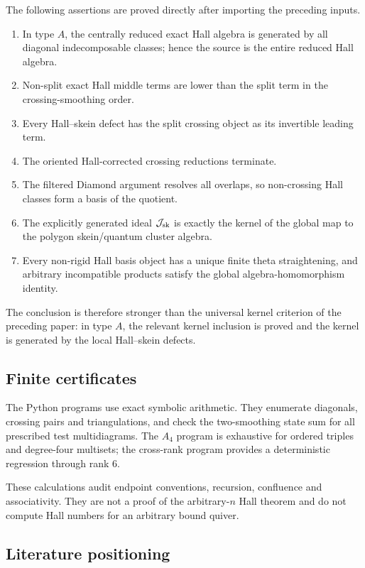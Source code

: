 The following assertions are proved directly after importing the preceding
inputs.
\begin{enumerate}[label=(\Alph*),leftmargin=2.5em]
\item In type $A$, the centrally reduced exact Hall algebra is generated by
      all diagonal indecomposable classes; hence the source is the entire
      reduced Hall algebra.
\item Non-split exact Hall middle terms are lower than the split term in the
      crossing-smoothing order.
\item Every Hall--skein defect has the split crossing object as its invertible
      leading term.
\item The oriented Hall-corrected crossing reductions terminate.
\item The filtered Diamond argument resolves all overlaps, so non-crossing
      Hall classes form a basis of the quotient.
\item The explicitly generated ideal $\mathcal J_{\mathrm{sk}}$ is exactly the kernel of the
      global map to the polygon skein/quantum cluster algebra.
\item Every non-rigid Hall basis object has a unique finite theta
      straightening, and arbitrary incompatible products satisfy the global
      algebra-homomorphism identity.
\end{enumerate}

The conclusion is therefore stronger than the universal kernel criterion of
the preceding paper: in type $A$, the relevant kernel inclusion is proved and
the kernel is generated by the local Hall--skein defects.

\subsection{Finite certificates}

The Python programs use exact symbolic arithmetic.  They enumerate diagonals,
crossing pairs and triangulations, and check the two-smoothing state sum for
all prescribed test multidiagrams.  The $A_4$ program is exhaustive for
ordered triples and degree-four multisets; the cross-rank program provides a
deterministic regression through rank $6$.

These calculations audit endpoint conventions, recursion, confluence and
associativity.  They are not a proof of the arbitrary-$n$ Hall theorem and do
not compute Hall numbers for an arbitrary bound quiver.

\subsection{Literature positioning}

